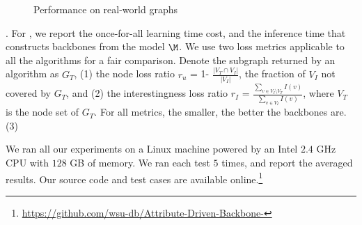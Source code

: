 \begin{figure}[tb!]
\centering
	\begin{center}
		\hfill{}
	\end{center}
\vspace{-2ex}
\caption{Performance on real-world graphs}
\label{fig:real1}
\end{figure}

. For \heuabd, we report
the once-for-all learning time cost, and the
inference time that constructs backbones from the model $\M$.
We use two loss metrics applicable to
all the algorithms
for a fair comparison.
Denote the subgraph returned by an
algorithm as $G_T$,
(1) the node loss ratio $r_u$ = 1- $\frac{|V_T\cap V_I|}{|V_I|}$,
\ie the fraction of $V_I$
not covered by $G_T$, and
(2) the interestingness loss ratio $r_I$ = $\frac{\sum_{v\in V_I\setminus V_T} I(v)}{\sum_{v\in V_I}I(v)}$, where $V_T$ is the node set of $G_T$.
For all metrics, the smaller, the better the backbones are.
(3) 


\vspace{.5ex}
We ran all our experiments on a Linux machine powered by an
Intel $2.4$ GHz CPU with $128$ GB of memory.
We ran each test $5$ times, and report the averaged results. Our source code and test cases are available online.\footnote{\scriptsize\url{https://github.com/wsu-db/Attribute-Driven-Backbone-}}

